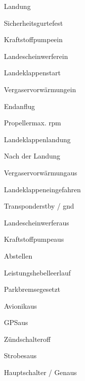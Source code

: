 \begin{memoryitem}
  \begin{checklist}{Landung}
    \item{Sicherheitsgurte}{fest}
    \item{Kraftstoffpumpe}{ein}
    \item{Landescheinwerfer}{ein}
    \item{Landeklappen}{start}
    \item{Vergaservorwärmung}{ein}
  \end{checklist}
\end{memoryitem}

\begin{memoryitem}
  \begin{checklist}{Endanflug}
    \item{Propeller}{max. rpm}
    \item{Landeklappen}{landung}
  \end{checklist}
\end{memoryitem}

\begin{memoryitem}
  \begin{checklist}{Nach der Landung}
    \item{Vergaservorwärmung}{aus}
    \item{Landeklappen}{eingefahren}
    \item{Transponder}{stby / gnd}
    \item{Landescheinwerfer}{aus}
    \item{Kraftstoffpumpe}{aus}
  \end{checklist}
\end{memoryitem}

\begin{memoryitem}
  \begin{checklist}{Abstellen}
    \item{Leistungshebel}{leerlauf}
    \item{Parkbremse}{gesetzt}
    \item{Avionik}{aus}
    \item{GPS}{aus}
    \item{Zündschalter}{off}
    \item{Strobes}{aus}
    \item{Hauptschalter / Gen}{aus}
  \end{checklist}
\end{memoryitem}

